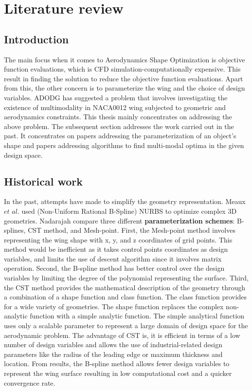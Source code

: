 \chapter{Literature review}
\label{literature}

\section{Introduction}
The main focus when it comes to Aerodynamics Shape Optimization is objective function evaluations, which is CFD simulation-computationally expensive. This result in finding the solution to reduce the objective function evaluations. Apart from this, the other concern is to parameterize the wing and the choice of design variables. ADODG has suggested a problem that involves investigating the existence of multimodality in NACA0012 wing subjected to geometric and aerodynamics constraints. This thesis mainly concentrates on addressing the above problem. The subsequent section addresses the work carried out in the past. It concentrates on papers addressing the parameterization of an object's shape and papers addressing algorithms to find multi-modal optima in the given design space.

\section{Historical work}
In the past, attempts have made to simplify the geometry representation. Meaux $et$  $al$. \cite{Meaux} used (Non-Uniform Rational B-Spline) NURBS to optimize complex 3D geometries. Nadarajah\cite{Nadarajah} compare three different \textbf{parameterization schemes}: B-splines, CST method, and Mesh-point. First, the Mesh-point method involves representing the wing shape with x, y, and z coordinates of grid points. This method would be inefficient as it takes control points coordinates as design variables, and limits the use of descent algorithm since it involves matrix operation. Second, the B-spline method has better control over the design variables by limiting the degree of the polynomial representing the surface. Third, the CST method provides the mathematical description of the geometry through a combination of a shape function and class function. The class function provides for a wide variety of geometries. The shape function replaces the complex non-analytic function with a simple analytic function. The simple analytical function uses only a scalable parameter to represent a large domain of design space for the aerodynamic problem. The advantage of CST is, it is efficient in terms of a low number of design variables and allows the use of industrial-related design parameters like the radius of the leading edge or maximum thickness and location\cite{Nadarajah}. From results, the B-spline method allows fewer design variables to represent the wing surface resulting in low computational cost and a quicker convergence rate. 


